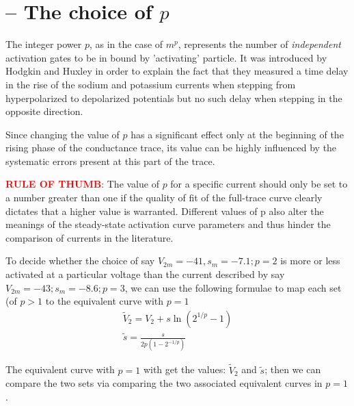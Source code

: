 \section{-- The choice of $p$}
\label{sec:HH-formula-power-p-value}

The integer power $p$, as in the case of $m^p$, represents the number of {\it
independent} activation gates to be in bound by 'activating' particle.
It was introduced by Hodgkin and Huxley in order to explain the fact that they
measured a time delay in the rise of the sodium and potassium currents when
stepping from hyperpolarized to depolarized potentials but no such delay when
stepping in the opposite direction.

Since changing the value of $p$ has a significant effect only at the beginning
of the rising phase of the conductance trace, its value can be highly influenced by
the systematic errors present at this part of the trace.

\textcolor{red}{\bf RULE OF THUMB}: The value of $p$ for a specific current
should only be set to a number greater than one if the quality of fit of the
full-trace curve clearly dictates that a higher value is warranted. Different
values of p also alter the meanings of the steady-state activation curve
parameters and thus hinder the comparison of currents in the literature.

To decide whether the choice of say $V_{2m}=-41, s_m=-7.1; p=2$ is more or less
activated at a particular voltage than the current described by say $V_{2m}=-43;
s_m=-8.6; p=3$, we can use the following formulae to map each set (of $p>1$ to
the equivalent curve with $p=1$
\begin{equation}
\begin{split}
\tilde{V}_2 = V_2 + s \ln\left( 2^{1/p} - 1 \right) \\
\tilde{s}  = \frac{s}{2 p \left( 1 - 2^{-1/p} \right)}
\end{split}
\end{equation}

The equivalent curve with $p=1$ with get the values: $\tilde{V}_2$ and
$\tilde{s}$; then we can compare the two sets via comparing the two
associated equivalent curves in $p=1$.


